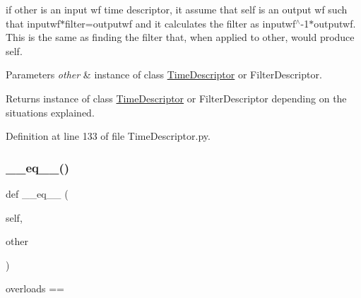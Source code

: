 if other is an input wf time descriptor, it assume that self is an output wf such that inputwf$\ast$filter=outputwf and it calculates the filter as inputwf$^\wedge$-\/1$\ast$outputwf. This is the same as finding the filter that, when applied to other, would produce self.


\begin{DoxyParams}{Parameters}
{\em other} & instance of class \hyperlink{classSignalIntegrity_1_1TimeDomain_1_1Waveform_1_1TimeDescriptor_1_1TimeDescriptor}{Time\+Descriptor} or Filter\+Descriptor. \\
\hline
\end{DoxyParams}
\begin{DoxyReturn}{Returns}
instance of class \hyperlink{classSignalIntegrity_1_1TimeDomain_1_1Waveform_1_1TimeDescriptor_1_1TimeDescriptor}{Time\+Descriptor} or Filter\+Descriptor depending on the situations explained. 
\end{DoxyReturn}


Definition at line 133 of file Time\+Descriptor.\+py.

\mbox{\label{classSignalIntegrity_1_1TimeDomain_1_1Waveform_1_1TimeDescriptor_1_1TimeDescriptor_ad794ff077f2f05f228a7109f3670ac40}} 
\subsubsection{\texorpdfstring{\+\_\+\+\_\+eq\+\_\+\+\_\+()}{\_\_eq\_\_()}}
{\footnotesize\ttfamily def \+\_\+\+\_\+eq\+\_\+\+\_\+ (\begin{DoxyParamCaption}\item[{}]{self,  }\item[{}]{other }\end{DoxyParamCaption})}



overloads == 


